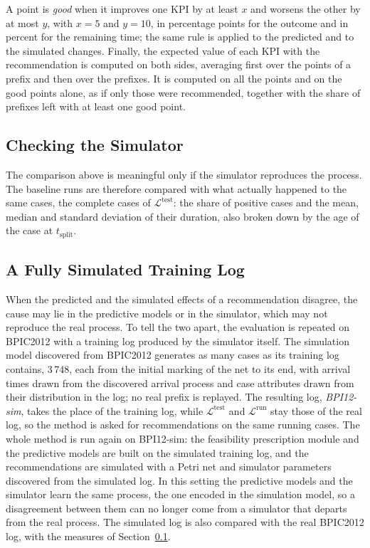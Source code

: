 A point is \emph{good} when it improves one KPI by at least $x$ and worsens
the other by at most $y$, with $x = 5$ and $y = 10$, in percentage points
for the outcome and in percent for the remaining time; the same rule is
applied to the predicted and to the simulated changes. Finally, the expected
value of each KPI with the recommendation is computed on both sides,
averaging first over the points of a prefix and then over the prefixes. It
is computed on all the points and on the good points alone, as if only those
were recommended, together with the share of prefixes left with at least one
good point.

\subsection{Checking the Simulator}
\label{subsec:ev:sim:check}
The comparison above is meaningful only if the simulator reproduces the
process. The baseline runs are therefore compared with what actually
happened to the same cases, the complete cases of
$\mathcal{L}^{\mathrm{test}}$: the share of positive cases and the mean,
median and standard deviation of their duration, also broken down by the age
of the case at $t_{\mathrm{split}}$.

\subsection{A Fully Simulated Training Log}
\label{subsec:ev:sim:full}
When the predicted and the simulated effects of a recommendation disagree,
the cause may lie in the predictive models or in the simulator, which may
not reproduce the real process. To tell the two apart, the evaluation is
repeated on BPIC2012 with a training log produced by the simulator itself.
The simulation model discovered from BPIC2012 generates as many cases as its
training log contains, 3\,748, each from the initial marking of the net to
its end, with arrival times drawn from the discovered arrival process and
case attributes drawn from their distribution in the log; no real prefix is
replayed. The resulting log, \emph{BPI12-sim}, takes the place of the
training log, while $\mathcal{L}^{\mathrm{test}}$ and
$\mathcal{L}^{\mathrm{run}}$ stay those of the real log, so the method is
asked for recommendations on the same running cases. The whole method is run
again on BPI12-sim: the feasibility prescription module and the predictive
models are built on the simulated training log, and the recommendations are
simulated with a Petri net and simulator parameters discovered from the
simulated log. In this setting the predictive models and the simulator learn
the same process, the one encoded in the simulation model, so a disagreement
between them can no longer come from a simulator that departs from the real
process. The simulated log is also compared with the real BPIC2012 log, with
the measures of Section~\ref{subsec:ev:sim:check}.
